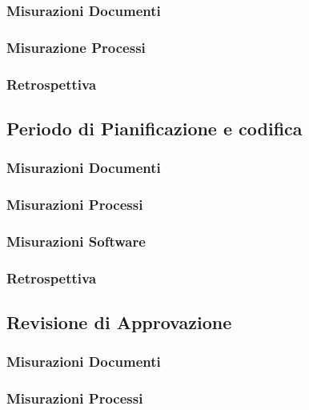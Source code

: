\documentclass[a4paper, oneside, openany, dvipsnames, table]{article}
\begin{document}
		\subsubsection{Misurazioni Documenti}
			
		\subsubsection{Misurazione Processi}
			
		\subsubsection{Retrospettiva}
			

\newpage
	\subsection{Periodo di Pianificazione e codifica}
		\subsubsection{Misurazioni Documenti}
			
		\subsubsection{Misurazioni Processi}
			
		\subsubsection{Misurazioni Software}
			
		\subsubsection{Retrospettiva}
			

\newpage
	\subsection{Revisione di Approvazione}
		\subsubsection{Misurazioni Documenti}
			
		\subsubsection{Misurazioni Processi}
			
\end{document}
